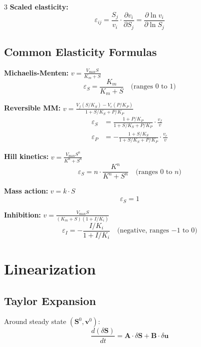 \documentclass[10pt,landscape,letter]{article}
\begin{document}
\begin{multicols}{3}
\textbf{Scaled elasticity:}
\begin{equation*}
\boxed{\varepsilon_{ij} = \frac{S_j}{v_i} \cdot \frac{\partial v_i}{\partial S_j} = \frac{\partial \ln v_i}{\partial \ln S_j}}
\end{equation*}

\subsection{Common Elasticity Formulas}

\textbf{Michaelis-Menten:} $v = \frac{V_{\max} S}{K_m + S}$
\begin{equation*}
\varepsilon_S = \frac{K_m}{K_m + S} \quad \text{(ranges 0 to 1)}
\end{equation*}

\textbf{Reversible MM:} $v = \frac{V_f(S/K_S) - V_r(P/K_P)}{1 + S/K_S + P/K_P}$
\begin{align*}
\varepsilon_S &= \frac{1 + P/K_P}{1 + S/K_S + P/K_P} \cdot \frac{v_f}{v} \\
\varepsilon_P &= -\frac{1 + S/K_S}{1 + S/K_S + P/K_P} \cdot \frac{v_r}{v}
\end{align*}

\textbf{Hill kinetics:} $v = \frac{V_{\max} S^n}{K^n + S^n}$
\begin{equation*}
\varepsilon_S = n \cdot \frac{K^n}{K^n + S^n} \quad \text{(ranges 0 to $n$)}
\end{equation*}

\textbf{Mass action:} $v = k \cdot S$
\begin{equation*}
\varepsilon_S = 1
\end{equation*}

\textbf{Inhibition:} $v = \frac{V_{\max} S}{(K_m + S)(1 + I/K_i)}$
\begin{equation*}
\varepsilon_I = -\frac{I/K_i}{1 + I/K_i} \quad \text{(negative, ranges $-1$ to 0)}
\end{equation*}

\section{Linearization}

\subsection{Taylor Expansion}
Around steady state $(\mathbf{S}^0, \mathbf{v}^0)$:
\begin{equation*}
\frac{d(\delta \mathbf{S})}{dt} = \mathbf{A} \cdot \delta \mathbf{S} + \mathbf{B} \cdot \delta \mathbf{u}
\end{equation*}


\end{multicols}
\end{document}
